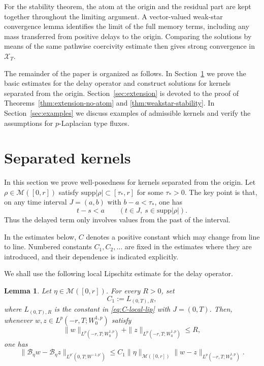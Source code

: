 \documentclass[a4paper,11pt,oneside,reqno]{amsart}
\newtheorem{lemma}[theorem]{Lemma}
\newcounter{c}
\newcounter{d}
\newcounter{b}
\newcommand{\supp}{\mathrm{supp}}
\newcommand{\M}{\mathcal{M}}
\begin{document}
For the stability theorem, the atom at the origin and the residual part are
kept together throughout the limiting argument. A vector-valued
weak-star convergence lemma identifies the limit of the full memory terms,
including any mass transferred from positive delays to the origin. Comparing
the solutions by means of the same pathwise coercivity estimate then gives
strong convergence in \(\mathcal X_T\).

The remainder of the paper is organized as follows.  In Section~\ref{sec:prelim}
we prove the basic estimates for the delay operator and construct solutions
for kernels separated from the origin.  Section~\ref{sec:extension} is devoted
to the proof of Theorems~\ref{thm:extension-no-atom} and
\ref{thm:weakstar-stability}. In Section~\ref{sec:examples} we
discuss examples of admissible kernels and verify the assumptions for
$p$-Laplacian type fluxes.

\section{Separated kernels}\label{sec:prelim}

In this section we prove well-posedness for kernels separated from the
origin. Let $\rho\in\M([0,r])$ satisfy $\supp|\rho|\subset[\tau_*,r]$
for some $\tau_*>0$. The key point is that, on any time interval
$J=(a,b)$ with $b-a<\tau_*$, one has
\[
 t-s<a
 \qquad
 (t\in J,\ s\in\supp|\rho|).
\]
Thus the delayed term only involves values from the past of the interval.

In the estimates below, \(C\) denotes a positive constant which may change
from line to line. Numbered constants \(C_1,C_2,\dots\) are fixed in the
estimates where they are introduced, and their dependence is indicated
explicitly.

We shall use the following local Lipschitz estimate for the delay operator.

\begin{lemma}\label{lem:Bnu-lip}
Let \(\eta\in\M([0,r])\).  For every \(R>0\), set
\[
 C_1:=L_{(0,T),R},
\]
where \(L_{(0,T),R}\) is the constant in \eqref{eq:C-local-lip} with
\(J=(0,T)\).  Then, whenever
\(w,z\in L^p(-r,T;W^{1,p}_0)\) satisfy
\[
 \|w\|_{L^p(-r,T;W^{1,p}_0)}
 +
 \|z\|_{L^p(-r,T;W^{1,p}_0)}
 \le R,
\]
one has
\begin{equation}
 \|\mathcal B_\eta w-\mathcal B_\eta z\|_{L^{p'}(0,T;W^{-1,p'})}
 \le
 C_1\|\eta\|_{\M([0,r])}
 \|w-z\|_{L^p(-r,T;W^{1,p}_0)}.
 \label{eq:Bnu-lip-section2}
\end{equation}
\end{lemma}
\end{document}
